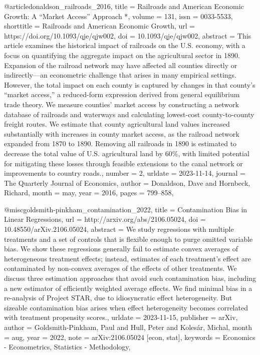 {{@article{donaldson_railroads_2016,
	title = {Railroads and {American} {Economic} {Growth}: {A} “{Market} {Access}” {Approach} *},
	volume = {131},
	issn = {0033-5533},
	shorttitle = {Railroads and {American} {Economic} {Growth}},
	url = {https://doi.org/10.1093/qje/qjw002},
	doi = {10.1093/qje/qjw002},
	abstract = {This article examines the historical impact of railroads on the U.S. economy, with a focus on quantifying the aggregate impact on the agricultural sector in 1890. Expansion of the railroad network may have affected all counties directly or indirectly—an econometric challenge that arises in many empirical settings. However, the total impact on each county is captured by changes in that county’s “market access,” a reduced-form expression derived from general equilibrium trade theory. We measure counties’ market access by constructing a network database of railroads and waterways and calculating lowest-cost county-to-county freight routes. We estimate that county agricultural land values increased substantially with increases in county market access, as the railroad network expanded from 1870 to 1890. Removing all railroads in 1890 is estimated to decrease the total value of U.S. agricultural land by 60\%, with limited potential for mitigating these losses through feasible extensions to the canal network or improvements to country roads.},
	number = {2},
	urldate = {2023-11-14},
	journal = {The Quarterly Journal of Economics},
	author = {Donaldson, Dave and Hornbeck, Richard},
	month = may,
	year = {2016},
	pages = {799--858},
}

@misc{goldsmith-pinkham_contamination_2022,
	title = {Contamination {Bias} in {Linear} {Regressions}},
	url = {http://arxiv.org/abs/2106.05024},
	doi = {10.48550/arXiv.2106.05024},
	abstract = {We study regressions with multiple treatments and a set of controls that is flexible enough to purge omitted variable bias. We show these regressions generally fail to estimate convex averages of heterogeneous treatment effects; instead, estimates of each treatment's effect are contaminated by non-convex averages of the effects of other treatments. We discuss three estimation approaches that avoid such contamination bias, including a new estimator of efficiently weighted average effects. We find minimal bias in a re-analysis of Project STAR, due to idiosyncratic effect heterogeneity. But sizeable contamination bias arises when effect heterogeneity becomes correlated with treatment propensity scores.},
	urldate = {2023-11-15},
	publisher = {arXiv},
	author = {Goldsmith-Pinkham, Paul and Hull, Peter and Kolesár, Michal},
	month = aug,
	year = {2022},
	note = {arXiv:2106.05024 [econ, stat]},
	keywords = {Economics - Econometrics, Statistics - Methodology},
}

}}
